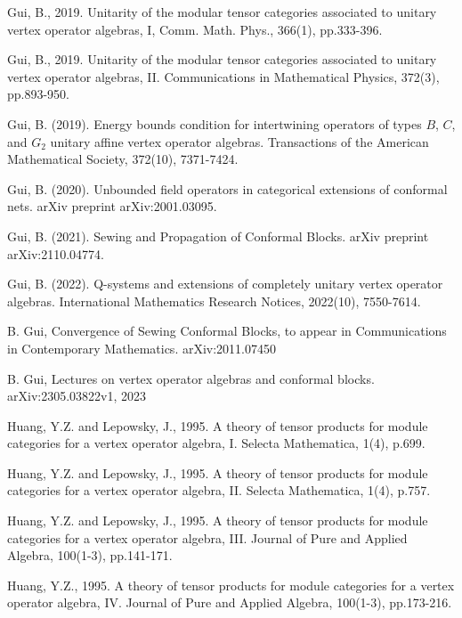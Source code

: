 \documentclass[11pt,b5paper,notitlepage]{article}
\theoremstyle{definition}
\theoremstyle{plain}
\numberwithin{equation}{section}
\begin{document}
\begin{thebibliography}{999999}
Gui, B., 2019. Unitarity of the modular tensor categories associated to unitary vertex operator algebras, I, Comm. Math. Phys., 366(1), pp.333-396.

Gui, B., 2019. Unitarity of the modular tensor categories associated to unitary vertex operator algebras, II. Communications in Mathematical Physics, 372(3), pp.893-950.


Gui, B. (2019). Energy bounds condition for intertwining operators of types $B$, $C$, and $G_2$ unitary affine vertex operator algebras. Transactions of the American Mathematical Society, 372(10), 7371-7424.



Gui, B. (2020). Unbounded field operators in categorical extensions of conformal nets. arXiv preprint arXiv:2001.03095.




Gui, B. (2021). Sewing and Propagation of Conformal Blocks. arXiv preprint arXiv:2110.04774. 


Gui, B. (2022). Q-systems and extensions of completely unitary vertex operator algebras. International Mathematics Research Notices, 2022(10), 7550-7614.




B. Gui, Convergence of Sewing Conformal Blocks, to appear in Communications in Contemporary Mathematics. arXiv:2011.07450




B. Gui,  Lectures on vertex operator algebras and conformal blocks. arXiv:2305.03822v1, 2023


Huang, Y.Z. and Lepowsky, J., 1995. A theory of tensor products for module categories
for a vertex operator algebra, I. Selecta Mathematica, 1(4), p.699.

Huang, Y.Z. and Lepowsky, J., 1995. A theory of tensor products for module categories
for a vertex operator algebra, II. Selecta Mathematica, 1(4), p.757.

Huang, Y.Z. and Lepowsky, J., 1995. A theory of tensor products for module categories
for a vertex operator algebra, III. Journal of Pure and Applied Algebra, 100(1-3), pp.141-171.

Huang, Y.Z., 1995. A theory of tensor products for module categories for a vertex operator algebra, IV. Journal of Pure and Applied Algebra, 100(1-3), pp.173-216.




\end{thebibliography}
\end{document}
